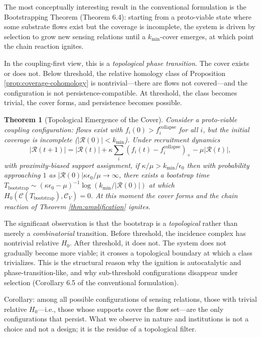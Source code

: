 \documentclass[11pt]{article}
\newtheorem{theorem}{Theorem}[section]
\theoremstyle{definition}
\theoremstyle{remark}
\begin{document}
The most conceptually interesting result in the conventional formulation is the Bootstrapping Theorem (Theorem 6.4): starting from a proto-viable state where some substrate flows exist but the coverage is incomplete, the system is driven by selection to grow new sensing relations until a $k_{\min}$-cover emerges, at which point the chain reaction ignites.

In the coupling-first view, this is a \emph{topological phase transition}. The cover exists or does not. Below threshold, the relative homology class of Proposition \ref{prop:coverage-cohomology} is nontrivial---there are flows not covered---and the configuration is not persistence-compatible. At threshold, the class becomes trivial, the cover forms, and persistence becomes possible.

\begin{theorem}[Topological Emergence of the Cover]
\label{thm:bootstrap}
Consider a proto-viable coupling configuration: flows exist with $f_i(0) > f_i^{\mathrm{collapse}}$ for all $i$, but the initial coverage is incomplete ($|\mathcal{R}(0)| < k_{\min}$). Under recruitment dynamics
\begin{equation}
|\mathcal{R}(t+1)| = |\mathcal{R}(t)| + \kappa \sum_i (f_i(t) - f_i^{\mathrm{collapse}})_+ - \mu |\mathcal{R}(t)|,
\end{equation}
with proximity-biased support assignment, if $\kappa/\mu > k_{\min}/\epsilon_0$ then with probability approaching $1$ as $|\mathcal{R}(0)| \kappa \epsilon_0 / \mu \to \infty$, there exists a bootstrap time $T_{\mathrm{bootstrap}} \sim (\kappa \epsilon_0 - \mu)^{-1} \log(k_{\min} / |\mathcal{R}(0)|)$ at which $H_0(\mathcal{C}(T_{\mathrm{bootstrap}}), \mathcal{C}_V) = 0$. At this moment the cover forms and the chain reaction of Theorem \ref{thm:amplification} ignites.
\end{theorem}

The significant observation is that the bootstrap is a \emph{topological} rather than merely a \emph{combinatorial} transition. Before threshold, the incidence complex has nontrivial relative $H_0$. After threshold, it does not. The system does not gradually become more viable; it crosses a topological boundary at which a class trivializes. This is the structural reason why the ignition is autocatalytic and phase-transition-like, and why sub-threshold configurations disappear under selection (Corollary 6.5 of the conventional formulation).

Corollary: among all possible configurations of sensing relations, those with trivial relative $H_0$---i.e., those whose supports cover the flow set---are the only configurations that persist. What we observe in nature and institutions is not a choice and not a design; it is the residue of a topological filter.
\end{document}
